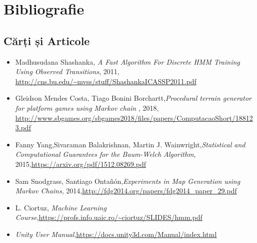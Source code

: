 \chapter*{Bibliografie} 
\section{Cărți și Articole}
\begin{itemize}
    \item{Madhusudana Shashanka, \textit{A Fast Algorithm For Discrete HMM Training Using Observed Transitions}, 2011, \newline \url{http://cns.bu.edu/~mvss/stuff/ShashankaICASSP2011.pdf}}
    \item{Gleidson Mendes Costa, Tiago Bonini Borchartt,\newline \textit{Procedural terrain generator for platform games using Markov chain
}, 2018,  \url{http://www.sbgames.org/sbgames2018/files/papers/ComputacaoShort/188123.pdf}}
	\item{Fanny Yang,Sivaraman Balakrishnan, Martin J. Wainwright,\newline \textit{Statistical and Computational Guarantees for the
Baum-Welch Algorithm}, 2015,\newline \url{https://arxiv.org/pdf/1512.08269.pdf}}
	\item{Sam Snodgrass, Santiago Ontañón,\newline \textit{Experiments in Map Generation using Markov Chains}, 2014,\newline \url{http://fdg2014.org/papers/fdg2014_paper_29.pdf}}
	\item {L. Ciortuz, \textit{Machine Learning Course},\newline \url{https://profs.info.uaic.ro/~ciortuz/SLIDES/hmm.pdf}}
	\item{\textit{Unity User Manual},\newline \url{https://docs.unity3d.com/Manual/index.html}}
\end{itemize}

\pagebreak

